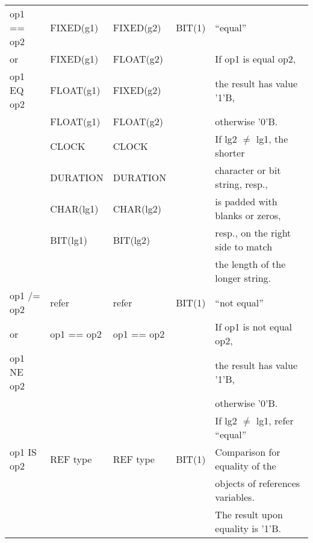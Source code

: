 \begin{table}
\begin{center}
\begin{tabular}{|l|l|l|l|l|}
op1 == op2       & FIXED(g1)       & FIXED(g2)       & BIT(1)               & ``equal''\\
or               & FIXED(g1)       & FLOAT(g2)       &                      & If op1 is equal op2,\\
op1 EQ op2       & FLOAT(g1)       & FIXED(g2)       &                      & the result has value '1'B,\\
                 & FLOAT(g1)       & FLOAT(g2)       &                      & otherwise '0'B.\\
                 & CLOCK           & CLOCK           &                      & If lg2 $\neq$ lg1, the shorter\\
                 & DURATION        & DURATION        &                      & character or bit string, resp.,\\
                 & CHAR(lg1)       & CHAR(lg2)       &                      & is padded with blanks or zeros,\\
                 & BIT(lg1)        & BIT(lg2)        &                      & resp., on the right side to match\\
                 &                 &                 &                      & the length of the longer string.\\ \hline

op1 /= op2       & refer         & refer         & BIT(1)               & ``not equal''\\
or               & op1 == op2     & op1 == op2     &                      & If op1 is not equal op2,\\
op1 NE op2       &                 &                 &                      & the result has value '1'B,\\
                 &                 &                 &                      & otherwise '0'B.\\
                 &                 &                 &                      & If lg2 $\neq$ lg1, refer ``equal''\\ \hline

op1 IS op2       & REF type        & REF type        & BIT(1)               & Comparison for equality of the\\
                 &                 &                 &                      & objects of references variables.\\
                 &                 &                 &                      & The result upon equality is '1'B.\\ \hline


\end{tabular}
\end{center}
\end{table}
